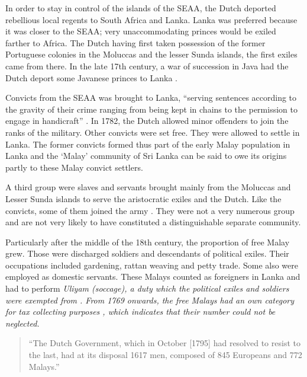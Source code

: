 In order to stay in control of the islands of the SEAA, the Dutch
deported rebellious local regents to South Africa and Lanka. Lanka
was preferred because it was closer to the SEAA; very
unaccommodating princes would be exiled farther to Africa. The
Dutch having first taken possession of the former Portuguese
colonies in the Moluccas and the lesser Sunda islands, the first
exiles came from there. In the late 17th century, a war of
succession in Java had the Dutch deport some Javanese princes to
Lanka \citep[38]{Hussainmiya1990}.

Convicts from the SEAA was brought to Lanka, ``serving sentences according to the gravity of their crime ranging from being kept in chains to the permission to engage in handicraft''  \citep[44]{Hussainmiya1990}.
In 1782, the Dutch allowed minor offenders to join the ranks of the military. Other convicts were set free. They were allowed to settle in Lanka.  The  former convicts formed thus  part of the early Malay population in Lanka and the `Malay' community of Sri Lanka can be said to owe its origins partly to these Malay convict settlers.

A third group were slaves and servants brought mainly from the Moluccas and Lesser Sunda islands to serve the aristocratic exiles and the Dutch. Like the convicts, some of them joined the army \citep[48]{Hussainmiya1990}. They were not a very numerous group and are not very likely to have constituted a distinguishable separate community.

Particularly after the middle of the 18th century, the proportion of free Malay grew. Those were discharged soldiers and descendants of political exiles. Their occupations included gardening, rattan weaving and petty trade. Some also were employed as domestic servants. These Malays counted as foreigners in Lanka and had to perform \em Uliyam \em (soccage), a duty which the  political exiles and soldiers were exempted from \citep[48f]{Hussainmiya1990}. From 1769 onwards, the free Malays had  an own category for tax collecting purposes \citep[9]{Bichsel}, which indicates that their number could not be neglected.

\begin{quote}
	``The Dutch Government, which in October [1795] had resolved to resist to the last, had at its disposal 1617 men, composed of 845 Europeans and 772 Malays.'' \citet[157]{Codrington1926}
\end{quote}


